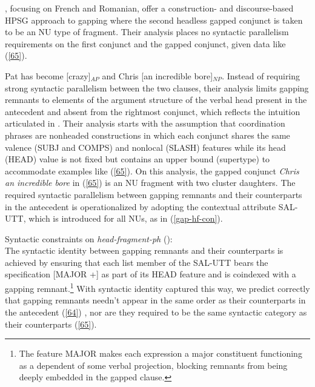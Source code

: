 \documentclass[output=paper
	        ,collection
	        ,collectionchapter
 	        ,biblatex
                ,babelshorthands
                ,newtxmath
                ,draftmode
                ,colorlinks, citecolor=brown
]{langscibook}
\begin{document}
{\citet{Abeille2014}, focusing on French and Romanian, offer a construction- and
discourse-based HPSG approach to gapping where the second headless gapped conjunct is taken to be an
NU type of fragment. Their analysis places no syntactic parallelism requirements on the
first conjunct and the gapped conjunct, given data like (\ref{65}).

\ea Pat has become [crazy]$_{AP}$ and Chris [an incredible bore]$_{NP}$.  \label{65}\z
%
Instead of requiring strong syntactic parallelism between the two clauses, their analysis limits gapping remnants to elements of the argument structure of the verbal head present in the antecedent and absent from the rightmost conjunct, which reflects the intuition articulated in \citet{Hankamer1971}. Their analysis starts with the assumption that coordination phrases are nonheaded constructions in which each conjunct shares the same
valence (SUBJ and COMPS) and nonlocal (SLASH) features while
 its head (HEAD) value is not fixed but contains an upper bound (supertype) to accommodate
 examples like (\ref{65}). On this analysis, the gapped conjunct {\it Chris an incredible
  bore} in (\ref{65}) is an NU fragment with two cluster daughters. The required
 syntactic parallelism between gapping remnants and their counterparts in the antecedent is operationalized by adopting the contextual attribute SAL-UTT, which is introduced for all NUs, as in (\ref{gap-hf-con}).

 \ea
\label{gap-hf-con}
Syntactic constraints on {\it head-fragment-ph} (\citealt[(53)]{Abeille2014}):\\
 \impl
{}
\z
The syntactic identity between gapping remnants and their counterparts is achieved
by ensuring that each list member of the SAL-UTT bears the specification [MAJOR +] as part of its HEAD feature and is coindexed with a gapping remnant.\footnote{The feature MAJOR makes each expression a major constituent functioning as a dependent of some verbal projection, blocking
remnants from being deeply embedded in the gapped clause.}
   With syntactic identity captured this way, we predict correctly that gapping remnants needn't appear in the same order as their counterparts in the antecedent (\ref{64}) \citep[see][156--158]{Sag1985}, nor are they required to be the same syntactic category as their counterparts (\ref{65}).

}
\end{document}
